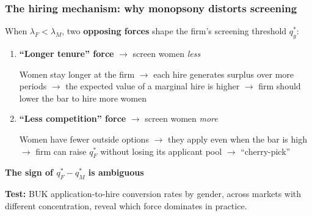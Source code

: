 \documentclass[aspectratio=169, 11pt]{beamer}
\begin{document}
\begin{frame}
\frametitle{The hiring mechanism: why monopsony distorts screening}

When $\lambda_F < \lambda_M$, two \textbf{opposing forces} shape the firm's screening threshold $q_g^*$:

\vspace{0.3cm}
\begin{enumerate}
    \item \textbf{``Longer tenure'' force} $\to$ screen women \emph{less}

    Women stay longer at the firm $\to$ each hire generates surplus over more periods $\to$ the expected value of a marginal hire is higher $\to$ firm should lower the bar to hire more women

    \bigskip
    \item \textbf{``Less competition'' force} $\to$ screen women \emph{more}

    Women have fewer outside options $\to$ they apply even when the bar is high $\to$ firm can raise $q_F^*$ without losing its applicant pool $\to$ ``cherry-pick''
\end{enumerate}

\vspace{0.3cm}
\textbf{The sign of $q_F^* - q_M^*$ is ambiguous} %

\vspace{0.2cm}
\textbf{Test:} BUK application-to-hire conversion rates by gender, across markets with different concentration, reveal which force dominates in practice.

\end{frame}
\end{document}
